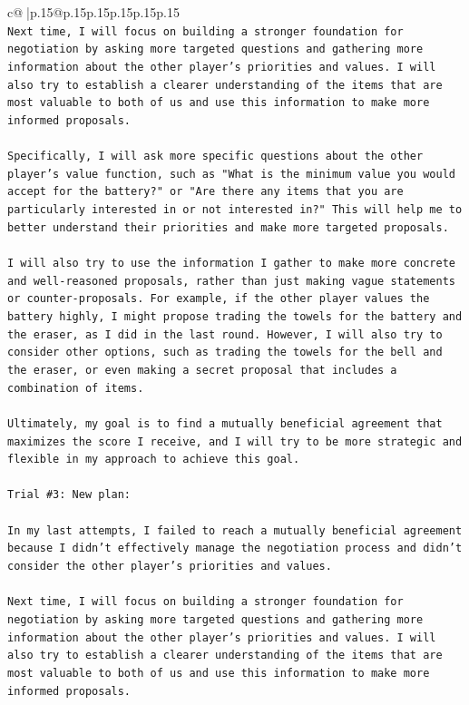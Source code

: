\documentclass{article}
\begin{document}
{\begin{supertabular}{c@{$\;$}|p{.15\linewidth}@{}p{.15\linewidth}p{.15\linewidth}p{.15\linewidth}p{.15\linewidth}p{.15\linewidth}}
{{{\\ 
\texttt{Next time, I will focus on building a stronger foundation for negotiation by asking more targeted questions and gathering more information about the other player's priorities and values. I will also try to establish a clearer understanding of the items that are most valuable to both of us and use this information to make more informed proposals.} \\
\\ 
\texttt{Specifically, I will ask more specific questions about the other player's value function, such as "What is the minimum value you would accept for the battery?" or "Are there any items that you are particularly interested in or not interested in?" This will help me to better understand their priorities and make more targeted proposals.} \\
\\ 
\texttt{I will also try to use the information I gather to make more concrete and well{-}reasoned proposals, rather than just making vague statements or counter{-}proposals. For example, if the other player values the battery highly, I might propose trading the towels for the battery and the eraser, as I did in the last round. However, I will also try to consider other options, such as trading the towels for the bell and the eraser, or even making a secret proposal that includes a combination of items.} \\
\\ 
\texttt{Ultimately, my goal is to find a mutually beneficial agreement that maximizes the score I receive, and I will try to be more strategic and flexible in my approach to achieve this goal.} \\
\\ 
\texttt{Trial \#3: New plan: } \\
\\ 
\texttt{In my last attempts, I failed to reach a mutually beneficial agreement because I didn't effectively manage the negotiation process and didn't consider the other player's priorities and values. } \\
\\ 
\texttt{Next time, I will focus on building a stronger foundation for negotiation by asking more targeted questions and gathering more information about the other player's priorities and values. I will also try to establish a clearer understanding of the items that are most valuable to both of us and use this information to make more informed proposals.} \\
}}}
\end{supertabular}}
\end{document}

